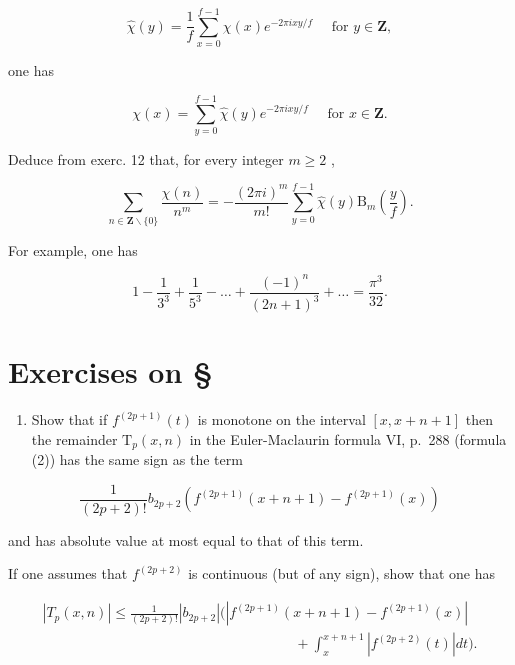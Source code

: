 \[
\hat {\chi} (y) = \frac {1}{f} \sum_ {x = 0} ^ {f - 1} \chi (x) e ^ {- 2 \pi i x y / f} \quad \text { for } y \in \mathbf {Z},
\]

one has

\[
\chi (x) = \sum_ {y = 0} ^ {f - 1} \hat {\chi} (y) e ^ {- 2 \pi i x y / f} \quad \text {   for   } x \in \mathbf {Z}.
\]

Deduce from exerc. 12 that, for every integer \(m \geqslant 2\) ,

\[
\sum_ {n \in \mathbf {Z} \backslash \{0 \}} \frac {\chi (n)}{n ^ {m}} = - \frac {(2 \pi i) ^ {m}}{m !} \sum_ {y = 0} ^ {f - 1} \hat {\chi} (y) \mathrm{B} _ {m} \left(\frac {y}{f}\right).
\]

For example, one has

\[
1 - \frac {1}{3 ^ {3}} + \frac {1}{5 ^ {3}} - \dots + \frac {(- 1) ^ {n}}{(2 n + 1) ^ {3}} + \dots = \frac {\pi^ {3}}{3 2}.
\]

\setcounter{exercisegroup}{2}
\section*{Exercises on \S{}}
{}

\begin{enumerate}
\def\labelenumi{\arabic{enumi})}
\tightlist
\item
  Show that if \(f^{(2p + 1)}(t)\) is monotone on the interval \([x, x + n + 1]\) then the remainder \(\mathrm{T}_p(x, n)\) in the Euler-Maclaurin formula VI, p.~288 (formula (2)) has the same sign as the term
\end{enumerate}

\[
\frac {1}{(2 p + 2) !} b _ {2 p + 2} \left(f ^ {(2 p + 1)} (x + n + 1) - f ^ {(2 p + 1)} (x)\right)
\]

and has absolute value at most equal to that of this term.

If one assumes that \(f^{(2p+2)}\) is continuous (but of any sign), show that one has

\[
\begin{array}{c} \left| T _ {p} (x, n) \right| \leqslant \frac {1}{(2 p + 2) !} \left| b _ {2 p + 2} \right| \Bigg (\left| f ^ {(2 p + 1)} (x + n + 1) - f ^ {(2 p + 1)} (x) \right| \\ \qquad \qquad \qquad \qquad \qquad \qquad \qquad \qquad \qquad + \int_ {x} ^ {x + n + 1} \left| f ^ {(2 p + 2)} (t) \right| d t \Bigg). \end{array}
\]

